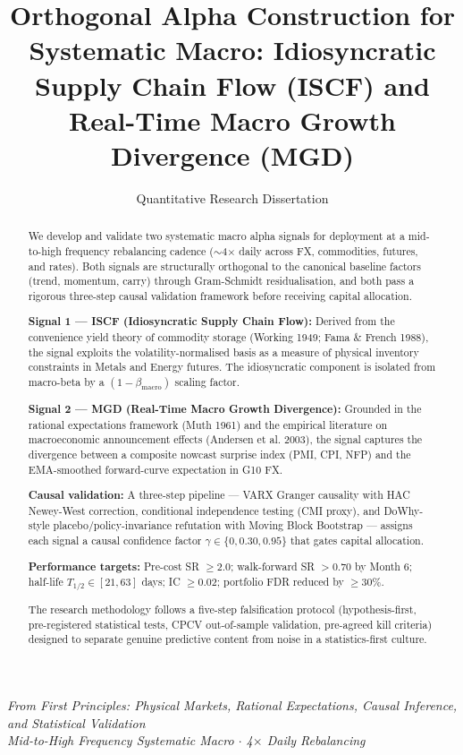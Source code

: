 \documentclass[11pt]{article}
\title{\textbf{Orthogonal Alpha Construction for Systematic Macro: Idiosyncratic Supply Chain Flow (ISCF) and Real-Time Macro Growth Divergence (MGD)}}
\author{Quantitative Research Dissertation}
\date{}
\begin{document}
\maketitle

\begin{center}
\textit{From First Principles: Physical Markets, Rational Expectations, Causal Inference, and Statistical Validation}\\[4pt]
\textit{Mid-to-High Frequency Systematic Macro $\cdot$ 4$\times$ Daily Rebalancing}
\end{center}

\begin{abstract}
We develop and validate two systematic macro alpha signals for deployment at a mid-to-high frequency rebalancing cadence ($\sim$4$\times$ daily across FX, commodities, futures, and rates). Both signals are structurally orthogonal to the canonical baseline factors (trend, momentum, carry) through Gram-Schmidt residualisation, and both pass a rigorous three-step causal validation framework before receiving capital allocation.

\textbf{Signal 1 --- ISCF (Idiosyncratic Supply Chain Flow):} Derived from the convenience yield theory of commodity storage (Working 1949; Fama \& French 1988), the signal exploits the volatility-normalised basis as a measure of physical inventory constraints in Metals and Energy futures. The idiosyncratic component is isolated from macro-beta by a $(1-\beta_{\text{macro}})$ scaling factor.

\textbf{Signal 2 --- MGD (Real-Time Macro Growth Divergence):} Grounded in the rational expectations framework (Muth 1961) and the empirical literature on macroeconomic announcement effects (Andersen et al. 2003), the signal captures the divergence between a composite nowcast surprise index (PMI, CPI, NFP) and the EMA-smoothed forward-curve expectation in G10 FX.

\textbf{Causal validation:} A three-step pipeline --- VARX Granger causality with HAC Newey-West correction, conditional independence testing (CMI proxy), and DoWhy-style placebo/policy-invariance refutation with Moving Block Bootstrap --- assigns each signal a causal confidence factor $\gamma \in \{0, 0.30, 0.95\}$ that gates capital allocation.

\textbf{Performance targets:} Pre-cost SR $\geq 2.0$; walk-forward SR $> 0.70$ by Month 6; half-life $T_{1/2} \in [21, 63]$ days; IC $\geq 0.02$; portfolio FDR reduced by $\geq 30\%$.

The research methodology follows a five-step falsification protocol (hypothesis-first, pre-registered statistical tests, CPCV out-of-sample validation, pre-agreed kill criteria) designed to separate genuine predictive content from noise in a statistics-first culture.
\end{abstract}
\end{document}
